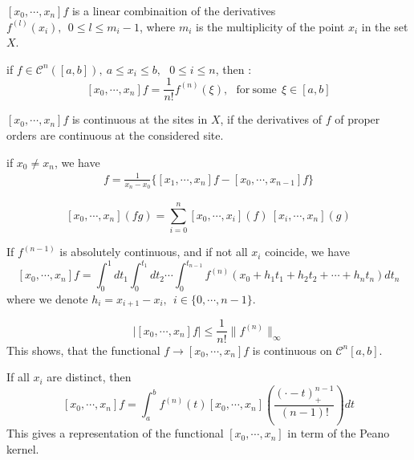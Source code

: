 \begin{proposition}
  $[x_0,\cdots,x_n]f$ is a linear combinaition of the derivatives $f^{(l)}(x_i),~~0 \leq l \leq m_i - 1$, where $m_i$ is the multiplicity of the point $x_i$ in the set $X$.
\end{proposition}
%
%
\begin{proposition}
  if $f \in \mathcal{C}^{n}([a,b]),~a\leq x_i \leq b, ~~~0 \leq i \leq n$, then :
$$
[x_0,\cdots,x_n]f = \frac{1}{n!}f^{(n)}(\xi), ~~~\mbox{for}~\mbox{some}~~ \xi \in  [a,b]
$$
\end{proposition}
%
\begin{proposition}
  $[x_0,\cdots,x_n]f$ is continuous at the sites in $X$, if the derivatives of $f$ of proper orders are continuous at the considered site.
\end{proposition}
%
\begin{proposition}
  if $x_0 \neq x_n$, we have 
  \begin{align}
  [x_0,\cdots,x_n]f  = \frac{1}{x_n-x_0}\{  [x_1,\cdots,x_n]f - [x_0,\cdots,x_{n-1}]f \}
  \end{align}
  \label{prop:dist}
\end{proposition}
%
\begin{proposition}  
 $$[x_0,\cdots,x_n](fg) = \sum_{i=0}^n [x_0,\cdots,x_i](f)~[x_i,\cdots,x_n](g)$$
\end{proposition}
%
\begin{proposition}
If $f^{(n-1)}$ is absolutely continuous, and if not all $x_i$ coincide, we have 
$$
[x_0,\cdots,x_n]f=\int_{0}^{1}dt_1 \int_{0}^{t_1}dt_2  \cdots \int_{0}^{t_{n-1}} f^{(n)}(x_0+h_1 t_1+h_2 t_2 +\cdots+h_n t_n )dt_n
$$
where we denote $h_i=x_{i+1}-x_i,~~i \in \{ 0, \cdots, n-1\}$. 
\end{proposition}
%
\begin{corollary}
$$
| [x_0,\cdots,x_n]f | \leq \frac{1}{n!}\| f^{(n)} \|_{\infty}
$$
This shows, that the functional  $f \rightarrow [x_0,\cdots,x_n]f$ is continuous on $\mathcal{C}^n[a,b]$. 
\end{corollary}
%
\begin{proposition}
  If all $x_i$ are distinct, then 
$$
[x_0,\cdots,x_n]f = \int_{a}^{b} f^{(n)}(t) [x_0,\cdots,x_n] \left( \frac{(\cdot - t)_{+}^{n-1}}{(n-1)!}\right) dt
$$
This gives a representation of the functional $[x_0,\cdots,x_n]$ in term of the Peano kernel.
\end{proposition}



